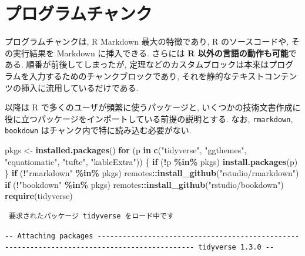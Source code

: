 \documentclass[
  nomag]{bxjsbook}
\newenvironment{Shaded}{\begin{snugshade}}{\end{snugshade}}
\newcommand{\ControlFlowTok}[1]{\textcolor[rgb]{0.13,0.29,0.53}{\textbf{#1}}}
\newcommand{\KeywordTok}[1]{\textcolor[rgb]{0.13,0.29,0.53}{\textbf{#1}}}
\newcommand{\NormalTok}[1]{#1}
\newcommand{\OperatorTok}[1]{\textcolor[rgb]{0.81,0.36,0.00}{\textbf{#1}}}
\newcommand{\StringTok}[1]{\textcolor[rgb]{0.31,0.60,0.02}{#1}}
\theoremstyle{definition}
\theoremstyle{definition}
\theoremstyle{definition}
\theoremstyle{remark}
\begin{document}
\hypertarget{ux30d7ux30edux30b0ux30e9ux30e0ux30c1ux30e3ux30f3ux30af}{%
\section{プログラムチャンク}\label{ux30d7ux30edux30b0ux30e9ux30e0ux30c1ux30e3ux30f3ux30af}}

プログラムチャンクは, R Markdown 最大の特徴であり, R のソースコードや,
その実行結果を Markdown に挿入できる. さらには \textbf{R
以外の言語の動作も可能}である. 順番が前後してしまったが,
定理などのカスタムブロックは本来はプログラムを入力するためのチャンクブロックであり,
それを静的なテキストコンテンツの挿入に流用しているだけである.

以降は R で多くのユーザが頻繁に使うパッケージと,
いくつかの技術文書作成に役に立つパッケージをインポートしている前提の説明とする.
なお, \texttt{rmarkdown}, \texttt{bookdown}
はチャンク内で特に読み込む必要がない.

\begin{Shaded}
\begin{Highlighting}[numbers=left,,]
\NormalTok{pkgs \textless{}{-}}\StringTok{ }\KeywordTok{installed.packages}\NormalTok{()}
\ControlFlowTok{for}\NormalTok{ (p }\ControlFlowTok{in} \KeywordTok{c}\NormalTok{(}\StringTok{"tidyverse"}\NormalTok{, }\StringTok{"ggthemes"}\NormalTok{, }\StringTok{"equatiomatic"}\NormalTok{, }\StringTok{"tufte"}\NormalTok{, }\StringTok{"kableExtra"}\NormalTok{)) \{}
  \ControlFlowTok{if}\NormalTok{ (}\OperatorTok{!}\NormalTok{p }\OperatorTok{\%in\%}\StringTok{ }\NormalTok{pkgs) }\KeywordTok{install.packages}\NormalTok{(p)}
\NormalTok{\}}
\ControlFlowTok{if}\NormalTok{ (}\OperatorTok{!}\StringTok{"rmarkdown"} \OperatorTok{\%in\%}\StringTok{ }\NormalTok{pkgs) remotes}\OperatorTok{::}\KeywordTok{install\_github}\NormalTok{(}\StringTok{"rstudio/rmarkdown"}\NormalTok{)}
\ControlFlowTok{if}\NormalTok{ (}\OperatorTok{!}\StringTok{"bookdown"} \OperatorTok{\%in\%}\StringTok{ }\NormalTok{pkgs) remotes}\OperatorTok{::}\KeywordTok{install\_github}\NormalTok{(}\StringTok{"rstudio/bookdown"}\NormalTok{)}
\KeywordTok{require}\NormalTok{(tidyverse)}
\end{Highlighting}
\end{Shaded}

\begin{verbatim}
 要求されたパッケージ tidyverse をロード中です 
\end{verbatim}

\begin{verbatim}
-- Attaching packages --------------------------------------------------------------------------------------------- tidyverse 1.3.0 --
\end{verbatim}
\end{document}
